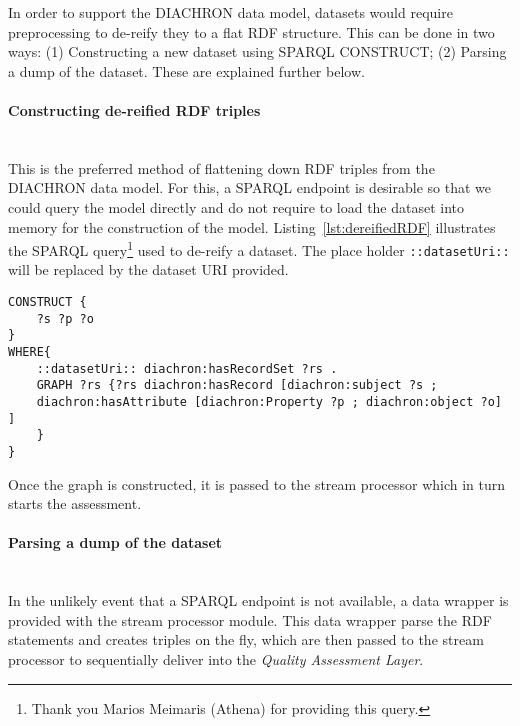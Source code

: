 In order to support the DIACHRON data model, datasets would require preprocessing to de-reify they to a flat RDF structure.
This can be done in two ways: (1) Constructing a new dataset using SPARQL CONSTRUCT; (2) Parsing a dump of the dataset.
These are explained further below.

\paragraph{Constructing de-reified RDF triples}~\\
This is the preferred method of flattening down RDF triples from the DIACHRON data model.
For this, a SPARQL endpoint is desirable so that we could query the model directly and do not require to load the dataset into memory for the construction of the model.
Listing~\ref{lst:dereifiedRDF} illustrates the SPARQL query\footnote{Thank you Marios Meimaris (Athena) for providing this query.} used to de-reify a dataset.
The place holder \texttt{::datasetUri::} will be replaced by the dataset URI provided.
\begin{lstlisting}[language=sparql,label=lst:dereifiedRDF]
CONSTRUCT {
	?s ?p ?o
}
WHERE{
	::datasetUri:: diachron:hasRecordSet ?rs .
	GRAPH ?rs {?rs diachron:hasRecord [diachron:subject ?s ;
	diachron:hasAttribute [diachron:Property ?p ; diachron:object ?o] ]
	}
}
\end{lstlisting}
Once the graph is constructed, it is passed to the stream processor which in turn starts the assessment.

\paragraph{Parsing a dump of the dataset}~\\
In the unlikely event that a SPARQL endpoint is not available, a data wrapper is provided with the stream processor module.
This data wrapper parse the RDF statements and creates triples on the fly, which are then passed to the stream processor to sequentially deliver into the \emph{Quality Assessment Layer}.

